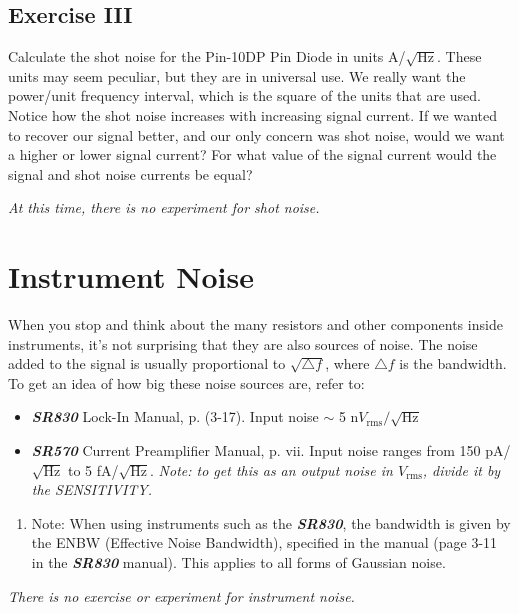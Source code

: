 \documentclass{../lab}
\begin{document}
\subsection{Exercise III}

Calculate the shot noise for the Pin-10DP Pin Diode in units A/$\sqrt{\text{Hz}}$. These units may seem peculiar, but they are in universal use. We really want the power/unit frequency interval, which is the square of the units that are used. Notice how the shot noise increases with increasing signal current. If we wanted to recover our signal better, and our only concern was shot noise, would we want a higher or lower signal current? For what value of the signal current would the signal and shot noise currents be equal?

\emph{At this time, there is no experiment for shot noise.}

\section{Instrument Noise}

When you stop and think about the many resistors and other components inside instruments, it's not surprising that they are also sources of noise. The noise added to the signal is usually proportional to $\sqrt{\triangle f}$, where $\triangle f$ is the bandwidth. To get an idea of how big these noise sources are, refer to:

\begin{itemize}
    \item \emph{\textbf{SR830}} Lock-In Manual, p. (3-17). Input noise $\sim$ 5 n$V_\text{rms}/\sqrt{\text{Hz}}$

    \item \emph{\textbf{SR570}} Current Preamplifier Manual, p. vii. Input noise ranges from 150 pA/$\sqrt{\text{Hz}}$ to 5 fA/$\sqrt{\text{Hz}}$. \emph{Note: to get this as an output noise in $V_\text{rms}$, divide it by the SENSITIVITY.}
\end{itemize}

\begin{enumerate}
    \item Note: When using instruments such as the \emph{\textbf{SR830}}, the bandwidth is given by the ENBW (Effective Noise Bandwidth), specified in the manual (page 3-11 in the \emph{\textbf{SR830}} manual). This applies to all forms of Gaussian noise.
\end{enumerate}

\noindent\emph{There is no exercise or experiment for instrument noise.}
\end{document}
